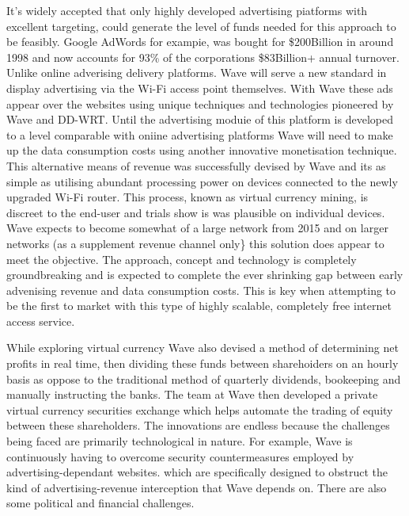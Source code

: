 \documentclass[letterpaper,10pt,openany,oneside,english]{sphinxmanual}
\begin{document}
It’s widely accepted that only highly developed advertising piatforms with excellent targeting, could generate the level of funds needed for this approach to be feasibly. Google AdWords for exampie, was bought for \$200Billion in around 1998 and now accounts for 93\% of the corporations \$83Billion+ annual turnover. Unlike online adverising delivery platforms. Wave will serve a new standard in display advertising via the Wi-Fi access point themselves. With Wave these ads appear over the websites using unique techniques and technologies pioneered by Wave and DD-WRT. Until the advertising moduie of this platform is developed to a level comparable with oniine advertising platforms Wave will need to make up the data consumption costs using another innovative monetisation technique. This alternative means of revenue was successfully devised by Wave and its as simple as utilising abundant processing power on devices connected to the newly upgraded Wi-Fi router. This process, known as virtual currency mining, is discreet to the end-user and trials show is was plausible on individual devices. Wave expects to become somewhat of a large network from 2015 and on larger networks (as a supplement revenue channel only\} this solution does appear to meet the objective. The approach, concept and technology is completely groundbreaking and is expected to complete the ever shrinking gap between early advenising revenue and data consumption costs. This is key when attempting to be the first to market with this type of highly scalable, completely free internet access service.

While exploring virtual currency Wave also devised a method of determining net profits in real time, then dividing these funds between sharehoiders on an hourly basis as oppose to the traditional method of quarterly dividends, bookeeping and manually instructing the banks. The team at Wave then developed a private virtual currency securities exchange which helps automate the trading of equity between these shareholders. The innovations are endless because the challenges being faced are primarily technological in nature. For example, Wave is continuously having to overcome security countermeasures employed by advertising-dependant websites. which are specifically designed to obstruct the kind of advertising-revenue interception that Wave depends on. There are also some political and financial challenges.
\end{document}

